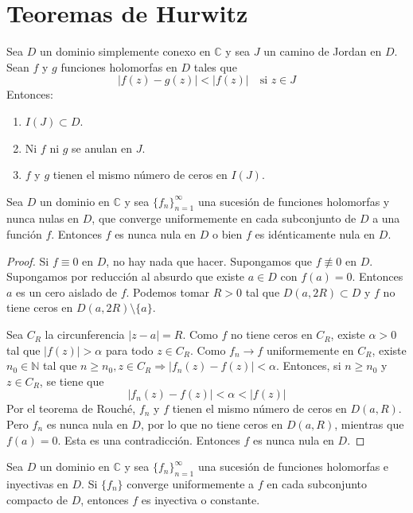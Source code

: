 \section{Teoremas de Hurwitz}
\begin{theorem}
    Sea $D$ un dominio simplemente conexo en $\mathbb{C}$ y sea $J$ un camino de Jordan en $D$.
    Sean $f$ y $g$ funciones holomorfas en $D$ tales que
    $$|f(z) - g(z)| < |f(z)| \quad \text{si } z \in J$$
    Entonces:
    \begin{enumerate}
        \item $I(J) \subset D$.
        \item Ni $f$ ni $g$ se anulan en $J$.
        \item $f$ y $g$ tienen el mismo número de ceros en $I(J)$.
    \end{enumerate}
\end{theorem}

\begin{theorem}
    Sea $D$ un dominio en $\mathbb{C}$ y sea $\{f_n\}_{n=1}^\infty$ una sucesión de funciones holomorfas y nunca nulas en $D$, que converge uniformemente en cada subconjunto de $D$ a una función $f$.
    Entonces $f$ es nunca nula en $D$ o bien $f$ es idénticamente nula en $D$.
\end{theorem}

\begin{proof}
    Si $f \equiv 0$ en $D$, no hay nada que hacer.
    Supongamos que $f \not\equiv 0$ en $D$.
    Supongamos por reducción al absurdo que existe $a \in D$ con $f(a) = 0$.
    Entonces $a$ es un cero aislado de $f$.
    Podemos tomar $R > 0$ tal que $D(a, 2R) \subset D$ y $f$ no tiene ceros en $D(a, 2R) \setminus \{a\}$.

    Sea $C_R$ la circunferencia $|z-a| = R$.
    Como $f$ no tiene ceros en $C_R$, existe $\alpha > 0$ tal que $|f(z)| > \alpha$ para todo $z \in C_R$.
    Como $f_n \to f$ uniformemente en $C_R$, existe $n_0 \in \mathbb{N}$ tal que $n \geq n_0, z \in C_R \Rightarrow |f_n(z) - f(z)| < \alpha$.
    Entonces, si $n \geq n_0$ y $z \in C_R$, se tiene que
    $$|f_n(z) - f(z)| < \alpha < |f(z)|$$
    Por el teorema de Rouché, $f_n$ y $f$ tienen el mismo número de ceros en $D(a, R)$.
    Pero $f_n$ es nunca nula en $D$, por lo que no tiene ceros en $D(a, R)$, mientras que $f(a) = 0$.
    Esta es una contradicción.
    Entonces $f$ es nunca nula en $D$.
\end{proof}

\begin{theorem}
    Sea $D$ un dominio en $\mathbb{C}$ y sea $\{f_n\}_{n=1}^\infty$ una sucesión de funciones holomorfas e inyectivas en $D$.
    Si $\{f_n\}$ converge uniformemente a $f$ en cada subconjunto compacto de $D$, entonces $f$ es inyectiva o constante.
\end{theorem}

